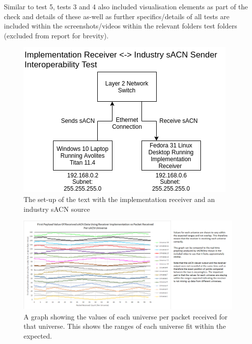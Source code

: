 \documentclass[11pt,a4paper]{article}
\begin{document}
Similar to test 5, tests 3 and 4 also included visualisation elements as part of the check and details of these as-well as further specifics/details of all tests are included within the screenshots/videos within the relevant folders test folders (excluded from report for brevity).\\

\begin{figure}[H]
	\label{AVO_SETUP}
	\includegraphics[width=\textwidth]{CS4099-Avo-setup.png}
	\caption{The set-up of the text with the implementation receiver and an industry sACN source}
\end{figure}

\begin{figure}[H]
	\label{RCV_INTEROP_TEST_5_GRAPH}
	\includegraphics[width=\textwidth]{test-5-processed-first-value-chart}
	\caption{A graph showing the values of each universe per packet received for that universe. This shows the ranges of each universe fit within the expected.}
\end{figure}
\end{document}
